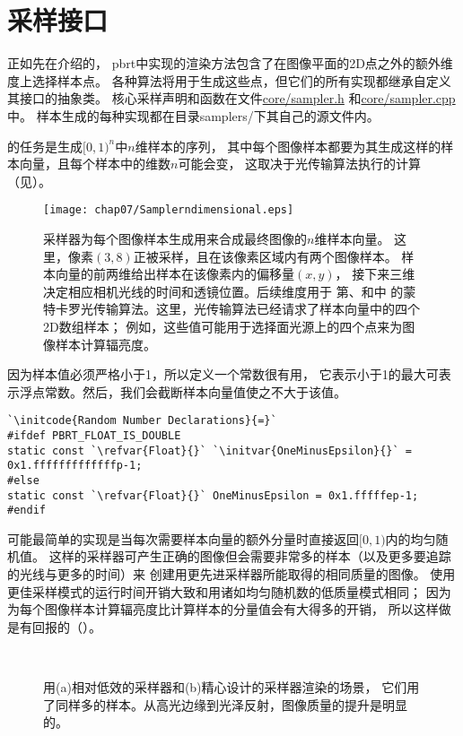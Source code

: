 \section{采样接口}\label{sec:采样接口}
正如先在介绍的，
pbrt中实现的渲染方法包含了在图像平面的2D点之外的额外维度上选择样本点。
各种算法将用于生成这些点，但它们的所有实现都继承自定义其接口的抽象类。
核心采样声明和函数在文件\href{https://github.com/mmp/pbrt-v3/blob/master/src/core/sampler.h}{\ttfamily core/sampler.h}
和\href{https://github.com/mmp/pbrt-v3/blob/master/src/core/sampler.cpp}{\ttfamily core/sampler.cpp}中。
样本生成的每种实现都在目录{\ttfamily samplers/}下其自己的源文件内。

的任务是生成$[0,1)^n$中$n$维样本的序列，
其中每个图像样本都要为其生成这样的样本向量，且每个样本中的维数$n$可能会变，
这取决于光传输算法执行的计算（见）。
\begin{figure}[htbp]
    \centering\texttt{[image: chap07/Samplerndimensional.eps]}
    \caption{采样器为每个图像样本生成用来合成最终图像的$n$维样本向量。
        这里，像素$(3,8)$正被采样，且在该像素区域内有两个图像样本。
        样本向量的前两维给出样本在该像素内的偏移量$(x,y)$，
        接下来三维决定相应相机光线的时间和透镜位置。后续维度用于
        第、和中
        的蒙特卡罗光传输算法。这里，光传输算法已经请求了样本向量中的四个2D数组样本；
        例如，这些值可能用于选择面光源上的四个点来为图像样本计算辐亮度。}
    \label{fig:7.13}
\end{figure}

因为样本值必须严格小于1，所以定义一个常数很有用，
它表示小于1的最大可表示浮点常数。然后，我们会截断样本向量值使之不大于该值。
\begin{lstlisting}
`\initcode{Random Number Declarations}{=}`
#ifdef PBRT_FLOAT_IS_DOUBLE
static const `\refvar{Float}{}` `\initvar{OneMinusEpsilon}{}` = 0x1.fffffffffffffp-1;
#else
static const `\refvar{Float}{}` OneMinusEpsilon = 0x1.fffffep-1;
#endif
\end{lstlisting}

可能最简单的实现是当每次需要样本向量的额外分量时直接返回$[0,1)$内的均匀随机值。
这样的采样器可产生正确的图像但会需要非常多的样本（以及更多要追踪的光线与更多的时间）来
创建用更先进采样器所能取得的相同质量的图像。
使用更佳采样模式的运行时间开销大致和用诸如均匀随机数的低质量模式相同；
因为为每个图像样本计算辐亮度比计算样本的分量值会有大得多的开销，
所以这样做是有回报的（）。
\begin{figure}[htbp]
    \centering
    \\
    \caption{用(a)相对低效的采样器和(b)精心设计的采样器渲染的场景，
        它们用了同样多的样本。从高光边缘到光泽反射，图像质量的提升是明显的。}
    \label{fig:7.14}
\end{figure}

